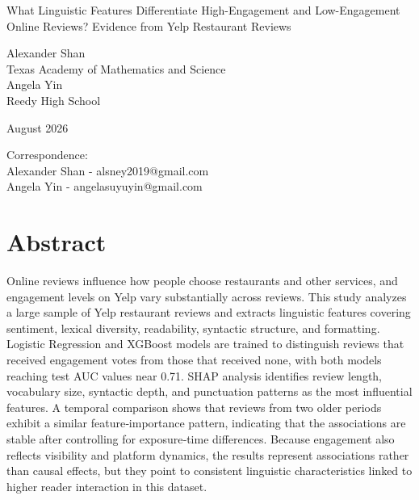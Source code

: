 \documentclass[
]{article}
\author{}
\date{}
\begin{document}
\begin{titlepage}
\centering

{\Huge What Linguistic Features Differentiate High-Engagement and Low-Engagement Online Reviews? Evidence from Yelp Restaurant Reviews\par}

\vspace{1.5cm}

{\Large
Alexander Shan \\
\vspace{0.1cm}
Texas Academy of Mathematics and Science \\
\vspace{0.5cm}
Angela Yin \\
\vspace{0.1cm}
Reedy High School
}

\vspace{1.5cm}

{\large August 2026}

\vfill

{\small
Correspondence: \\
Alexander Shan - alsney2019@gmail.com \\
Angela Yin - angelasuyuyin@gmail.com 
}

\vspace{0.5cm}

\end{titlepage}

\fontsize{12pt}{12pt}\selectfont

\hypertarget{abstract}{%
\section{Abstract}\label{abstract}}

Online reviews influence how people choose restaurants and other
services, and engagement levels on Yelp vary substantially across
reviews. This study analyzes a large sample of Yelp restaurant reviews
and extracts linguistic features covering sentiment, lexical diversity,
readability, syntactic structure, and formatting. Logistic Regression
and XGBoost models are trained to distinguish reviews that received
engagement votes from those that received none, with both models
reaching test AUC values near 0.71. SHAP analysis identifies review
length, vocabulary size, syntactic depth, and punctuation patterns as
the most influential features. A temporal comparison shows that reviews
from two older periods exhibit a similar feature‑importance pattern,
indicating that the associations are stable after controlling for
exposure‑time differences. Because engagement also reflects visibility
and platform dynamics, the results represent associations rather than
causal effects, but they point to consistent linguistic characteristics
linked to higher reader interaction in this dataset.
\end{document}
